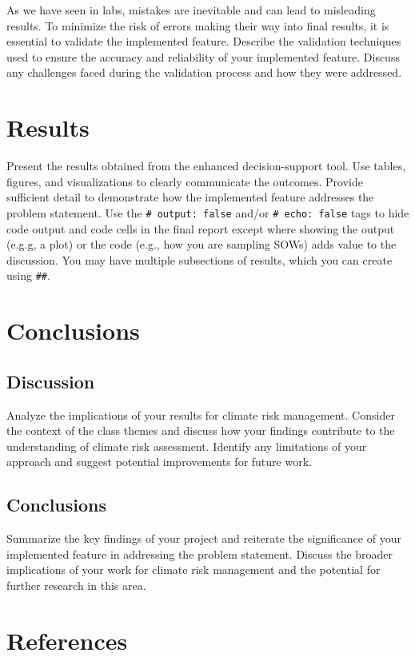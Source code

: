 \documentclass[
  11pt,
]{article}
\newlength{\cslhangindent}
\newenvironment{CSLReferences}[2] %
 {\begin{list}{}{%
  \setlength{\itemindent}{0pt}
  \setlength{\leftmargin}{0pt}
  \setlength{\parsep}{0pt}
  \ifodd #1
   \setlength{\leftmargin}{\cslhangindent}
   \setlength{\itemindent}{-1\cslhangindent}
  \fi
  \setlength{\itemsep}{#2\baselineskip}}}
 {\end{list}}
\begin{document}
As we have seen in labs, mistakes are inevitable and can lead to
misleading results. To minimize the risk of errors making their way into
final results, it is essential to validate the implemented feature.
Describe the validation techniques used to ensure the accuracy and
reliability of your implemented feature. Discuss any challenges faced
during the validation process and how they were addressed.

\section{Results}\label{results}

Present the results obtained from the enhanced decision-support tool.
Use tables, figures, and visualizations to clearly communicate the
outcomes. Provide sufficient detail to demonstrate how the implemented
feature addresses the problem statement. Use the
\texttt{\#\textbar{}\ output:\ false} and/or
\texttt{\#\textbar{}\ echo:\ false} tags to hide code output and code
cells in the final report except where showing the output (e.g.g, a
plot) or the code (e.g., how you are sampling SOWs) adds value to the
discussion. You may have multiple subsections of results, which you can
create using \texttt{\#\#}.

\section{Conclusions}\label{conclusions}

\subsection{Discussion}\label{discussion}

Analyze the implications of your results for climate risk management.
Consider the context of the class themes and discuss how your findings
contribute to the understanding of climate risk assessment. Identify any
limitations of your approach and suggest potential improvements for
future work.

\subsection{Conclusions}\label{conclusions-1}

Summarize the key findings of your project and reiterate the
significance of your implemented feature in addressing the problem
statement. Discuss the broader implications of your work for climate
risk management and the potential for further research in this area.

\section{References}\label{references}

\label{refs}
\begin{CSLReferences}{0}{1}
\end{CSLReferences}
\end{document}
